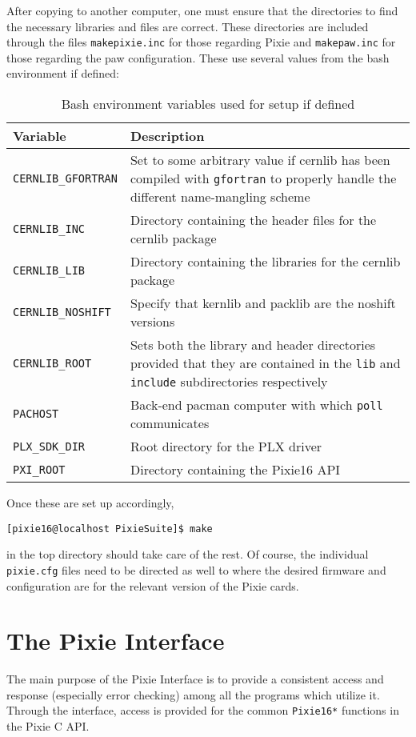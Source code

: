 \documentclass[10pt]{article}
\begin{document}
After copying to another computer, one must ensure that the directories to
find the necessary libraries and files are correct. These directories are
included through the files \texttt{makepixie.inc} for those regarding Pixie
and \texttt{makepaw.inc} for those regarding the paw configuration. These use
several values from the bash environment if defined:
\begin{table}[ht]
\label{fig:bashenv}
\caption{Bash environment variables used for setup if defined}
\begin{tabular}{lp{3in}}
\hline
Variable & Description \\
\hline
\texttt{CERNLIB\_GFORTRAN} & Set to some arbitrary value if cernlib has been
compiled with \texttt{gfortran} to properly handle the different name-mangling
scheme \\
\texttt{CERNLIB\_INC}      & Directory containing the header files for the cernlib
package \\
\texttt{CERNLIB\_LIB}      & Directory containing the libraries for the
cernlib package \\
\texttt{CERNLIB\_NOSHIFT}  & Specify that kernlib and packlib are the noshift
versions \\
\texttt{CERNLIB\_ROOT}     & Sets both the library and header directories provided
that they are contained in the \texttt{lib} and \texttt{include}
subdirectories respectively \\
\texttt{PACHOST}           & Back-end pacman computer with which \texttt{poll}
communicates \\
\texttt{PLX\_SDK\_DIR}     & Root directory for the PLX driver \\
\texttt{PXI\_ROOT}         & Directory containing the Pixie16 API \\
\end{tabular}
\end{table}
Once these are set up accordingly,
\begin{verbatim}
[pixie16@localhost PixieSuite]$ make
\end{verbatim}
in the top directory should take care of the rest. Of course, the individual \texttt{pixie.cfg} files need to be directed as well to where the desired firmware and configuration are for the relevant version of the Pixie cards.
\section{\label{sec:pi}The Pixie Interface}
The main purpose of the Pixie Interface is to provide a consistent access and response (especially error checking) among all the programs which utilize it. Through the interface, access is provided for the common \texttt{Pixie16*} functions in the Pixie C API. 
\end{document}
